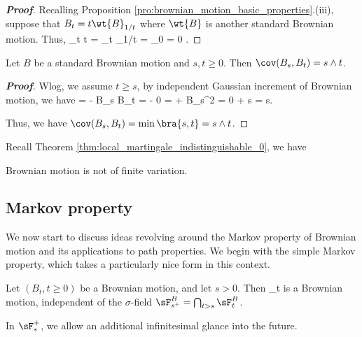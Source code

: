 \begin{proof}[\bf Proof]
Recalling Proposition \ref{pro:brownian_motion_basic_properties}.(iii), suppose that $B_t = t\wt{B}_{1/t}$ where $\wt{B}$ is another standard Brownian motion. Thus,
\be
\lim_{t\to\infty} t = \lim_{t\to \infty} _{1/t} = _0 = 0 .
\ee
\end{proof}

\begin{lemma}\label{lem:standard_brownian_motion_covariance}
Let $B$ be a standard Brownian motion and $s, t \geq 0$. Then $\cov(B_s,B_t) = s \land t$.
\end{lemma}

\begin{proof}[\bf Proof]
Wlog, we assume $t\geq s$, by independent Gaussian increment of Brownian motion, we have
\be
\cov {} = \E{} - \E B_s \E B_t = \E{} - 0 = \E{} + \E\bb B_s^2 = 0 + s = s.
\ee

Thus, we have $\cov(B_s,B_t) = \min\bra{s,t} = s \land t$.
\end{proof}

Recall Theorem \ref{thm:local_martingale_indistinguishable_0}, we have
\begin{proposition}\label{pro:brownian_motion_no_finite_variation}
Brownian motion is not of finite variation.
\end{proposition}

\subsection{Markov property}

We now start to discuss ideas revolving around the Markov property of Brownian motion and its applications to path properties. We begin with the simple Markov property, which takes a particularly nice form in this context.


\begin{theorem}\label{thm:simple_markov_property_brownian_motion}
Let $(B_t, t \geq 0)$ be a Brownian motion, and let $s > 0$. Then
\be
{}_{t }
\ee
is a Brownian motion, independent of the $\sigma$-field $\sF^B_{s^+} = \bigcap_{t>s} \sF^B_t$.
\end{theorem}

\begin{remark}
In $\sF_s^+$, we allow an additional infinitesimal glance into the future.
\end{remark}

